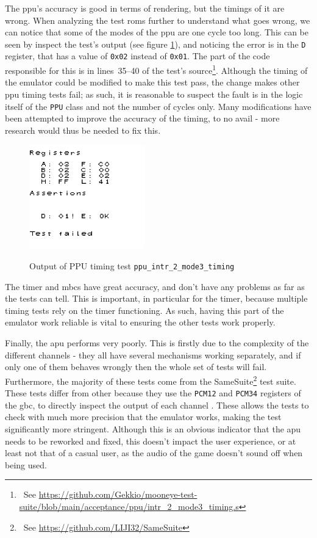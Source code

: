 \documentclass[11pt]{informatics-report}
\newcommand{\ftnt}[1]{\footnote{~See \url{#1}}}
\begin{document}
The \gls{ppu}'s accuracy is good in terms of rendering, but the timings of it are wrong. When analyzing the test \glspl{rom} further to understand what goes wrong, we can notice that some of the modes of the \gls{ppu} are one cycle too long. This can be seen by inspect the test's output (see figure \ref{fig:failed-ppu-timing-test}), and noticing the error is in the \texttt{D} register, that has a value of \texttt{0x02} instead of \texttt{0x01}. The part of the code responsible for this is in lines~35--40 of the test's source\ftnt{https://github.com/Gekkio/mooneye-test-suite/blob/main/acceptance/ppu/intr\_2\_mode3\_timing.s}. Although the timing of the emulator could be modified to make this test pass, the change makes other \gls{ppu} timing tests fail; as such, it is reasonable to suspect the fault is in the logic itself of the \texttt{PPU} class and not the number of cycles only. Many modifications have been attempted to improve the accuracy of the timing, to no avail - more research would thus be needed to fix this.

\begin{figure}[h]
    \centering
    \includegraphics[width=5cm]{images/failed-ppu-timing-test}\\
    \caption{Output of PPU timing test \texttt{ppu\_intr\_2\_mode3\_timing}}
    \label{fig:failed-ppu-timing-test}
\end{figure}

The timer and \glspl{mbc} have great accuracy, and don't have any problems as far as the tests can tell. This is important, in particular for the timer, because multiple timing tests rely on the timer functioning. As such, having this part of the emulator work reliable is vital to ensuring the other tests work properly.

Finally, the \gls{apu} performs very poorly. This is firstly due to the complexity of the different channels - they all have several mechanisms working separately, and if only one of them behaves wrongly then the whole set of tests will fail. Furthermore, the majority of these tests come from the SameSuite\ftnt{https://github.com/LIJI32/SameSuite} test suite. These tests differ from other because they use the \texttt{PCM12} and \texttt{PCM34} registers of the \gls{gbc}, to directly inspect the output of each channel \cite[Audio Details]{pandoc}. These allows the tests to check with much more precision that the emulator works, making the test significantly more stringent. Although this is an obvious indicator that the \gls{apu} needs to be reworked and fixed, this doesn't impact the user experience, or at least not that of a casual user, as the audio of the game doesn't sound off when being used.
\end{document}
